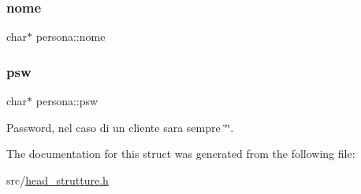 \mbox{\label{structpersona_a2ed3f97d34f345afe9db642281887d22}} 
\subsubsection{\texorpdfstring{nome}{nome}}
{\footnotesize\ttfamily char$\ast$ persona\+::nome}

\mbox{\label{structpersona_a1deff419a5867b08c46201d4d439035e}} 
\subsubsection{\texorpdfstring{psw}{psw}}
{\footnotesize\ttfamily char$\ast$ persona\+::psw}

Password, nel caso di un cliente sara\textquotesingle{} sempre \char`\"{}\char`\"{}. 

The documentation for this struct was generated from the following file\+:\begin{DoxyCompactItemize}
\item 
src/\hyperlink{head__strutture_8h}{head\+\_\+strutture.\+h}\end{DoxyCompactItemize}
